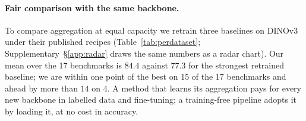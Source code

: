 \paragraph{Fair comparison with the same backbone.} To compare aggregation at equal capacity we retrain three baselines on DINOv3 under their published recipes (Table~\ref{tab:perdataset}; Supplementary~\S\ref{app:radar} draws the same numbers as a radar chart). Our mean over the 17 benchmarks is $84.4$ against $77.3$ for the strongest retrained baseline; we are within one point of the best on 15 of the 17 benchmarks and ahead by more than $14$ on 4. A method that learns its aggregation pays for every new backbone in labelled data and fine-tuning; a training-free pipeline adopts it by loading it, at no cost in accuracy.


\begin{table}[!htb]
\caption{Matched-backbone comparison on all 17 benchmarks: three baselines retrained on DINOv3 under their published recipes against our pipeline on the same backbone; all rows are our runs. Bold indicates the best value and underline the second best over all rows.}
\label{tab:perdataset}
\centering
{\scriptsize\setlength{\tabcolsep}{2.6pt}%
%
}
\end{table}
